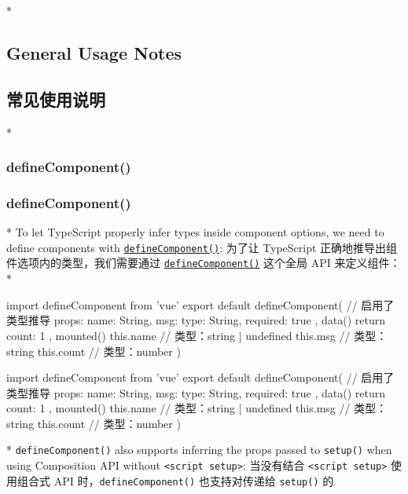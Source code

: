 \begin{paracol}{2} 
 
\switchcolumn[0]*%
\subsection{General Usage Notes}
\switchcolumn
\subsection{常见使用说明}
\switchcolumn[0]*%
\subsubsection{defineComponent()}
\switchcolumn
\subsubsection{defineComponent()}
\switchcolumn[0]*%
To let TypeScript properly infer types inside component options, we need
to define components with
\href{https://vuejs.org/api/general.html\#definecomponent}{\texttt{defineComponent()}}:
\switchcolumn
为了让 TypeScript 正确地推导出组件选项内的类型，我们需要通过
\href{https://cn.vuejs.org/api/general.html\#definecomponent}{\texttt{defineComponent()}}
这个全局 API 来定义组件：
\switchcolumn[0]*%
\begin{codeJs}
import { defineComponent } from 'vue'
export default defineComponent({
  // 启用了类型推导
  props: {
    name: String,
    msg: { type: String, required: true }
  },
  data() {
    return {
      count: 1
    }
  },
  mounted() {
    this.name // 类型：string | undefined
    this.msg // 类型：string
    this.count // 类型：number
  }
})
\end{codeJs}
\switchcolumn
\begin{codeJs}
import { defineComponent } from 'vue'
export default defineComponent({
  // 启用了类型推导
  props: {
    name: String,
    msg: { type: String, required: true }
  },
  data() {
    return {
      count: 1
    }
  },
  mounted() {
    this.name // 类型：string | undefined
    this.msg // 类型：string
    this.count // 类型：number
  }
})
\end{codeJs}
\switchcolumn[0]*%
\texttt{defineComponent()} also supports inferring the props passed to
\texttt{setup()} when using Composition API without
\texttt{\textless{}script\ setup\textgreater{}}:
\switchcolumn
当没有结合 \texttt{\textless{}script\ setup\textgreater{}} 使用组合式
API 时，\texttt{defineComponent()} 也支持对传递给 \texttt{setup()} 的

\end{paracol}
